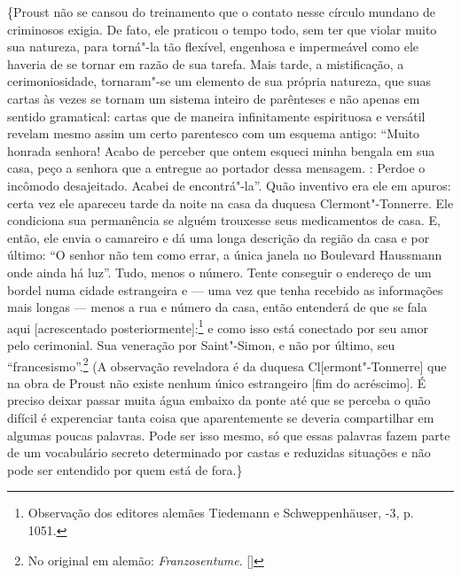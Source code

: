 \{Proust não se cansou do treinamento que o contato nesse círculo
mundano de criminosos exigia. De fato, ele praticou o tempo todo, sem
ter que violar muito sua natureza, para torná"-la tão flexível, engenhosa
e impermeável como ele haveria de se tornar em razão de sua tarefa.
Mais tarde, a mistificação, a cerimoniosidade, tornaram"-se um elemento de
sua própria natureza, que suas cartas às vezes se tornam um sistema
inteiro de parênteses e não apenas em sentido gramatical: cartas que de
maneira infinitamente espirituosa e versátil revelam mesmo assim um
certo parentesco com um esquema antigo: ``Muito honrada senhora! Acabo
de perceber que ontem esqueci minha bengala em sua casa, peço a senhora
que a entregue ao portador dessa mensagem. : Perdoe o incômodo
desajeitado. Acabei de encontrá"-la''. Quão inventivo era ele em apuros:
certa vez ele apareceu tarde da noite na casa da duquesa
Clermont"-Tonnerre. Ele condiciona sua permanência se alguém trouxesse
seus medicamentos de casa. E, então, ele envia o camareiro e dá uma
longa descrição da região da casa e por último: ``O senhor não tem como
errar, a única janela no Boulevard Haussmann onde ainda há luz''. Tudo,
menos o número. Tente conseguir o endereço de um bordel numa cidade
estrangeira e --- uma vez que tenha recebido as informações mais longas ---
menos a rua e número da casa, então entenderá de que se fala aqui
{[}acrescentado posteriormente{]}:\footnote{Observação dos editores
  alemães Tiedemann e Schweppenhäuser, -3, p. 1051. \versal{[N.~O.]}} e
como isso está conectado por seu amor pelo cerimonial. Sua veneração por
Saint"-Simon, e não por último, seu ``francesismo''.\footnote{No original em alemão: \emph{Franzosentume}. []}
(A observação reveladora é da duquesa Cl{[}ermont"-Tonnerre{]} que na
obra de Proust não existe nenhum único estrangeiro {[}fim do
acréscimo{]}. É preciso deixar passar muita água embaixo da ponte até
que se perceba o quão difícil é experenciar tanta coisa que
aparentemente se deveria compartilhar em algumas poucas palavras. Pode
ser isso mesmo, só que essas palavras fazem parte de um vocabulário
secreto determinado por castas e reduzidas situações e não pode ser
entendido por quem está de fora.\}

